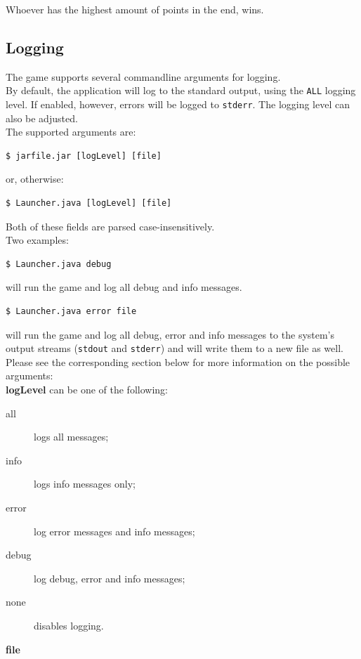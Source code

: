 \documentclass[a4paper,11pt,report]{scrartcl}
\begin{document}
Whoever has the highest amount of points in the end, wins.

\subsection{Logging}
The game supports several commandline arguments for logging.\\

By default, the application will log to the standard output, using the
\texttt{ALL} logging level. If enabled, however, errors will be logged to
\texttt{stderr}. The logging level can also be adjusted.\\

The supported arguments are:
\begin{verbatim}
$ jarfile.jar [logLevel] [file]
\end{verbatim}
or, otherwise:
\begin{verbatim}
$ Launcher.java [logLevel] [file]
\end{verbatim}
Both of these fields are parsed case-insensitively.\\

Two examples:
\begin{verbatim}
$ Launcher.java debug
\end{verbatim}
will run the game and log all debug and info messages. 
\begin{verbatim}
$ Launcher.java error file
\end{verbatim}
will run the game and log all debug, error and info messages to the system's
output streams (\texttt{stdout} and \texttt{stderr}) and will write them to a
new file as well.\\

Please see the corresponding section below for more information on the possible
arguments:\\

\textbf{logLevel} can be one of the following:
\begin{description}
	\item[all] logs all messages;
	\item[info] logs info messages only;
	\item[error] log error messages and info messages;
	\item[debug] log debug, error and info messages;
	\item[none] disables logging.
\end{description}

\textbf{file}
\end{document}
